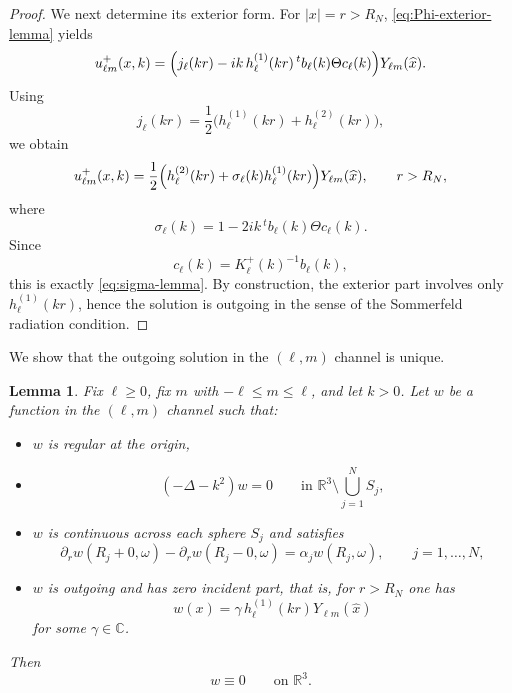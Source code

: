 \documentclass[a4paper,11pt]{article}
\numberwithin{equation}{section}
\newcommand{\R}{\mathbb{R}}
\newcommand{\C}{\mathbb{C}}
\newcommand{\jj}[1]{j_{#1}}
\newcommand{\hj}[1]{h^{(1)}_{#1}}
\newtheorem{lem}[thm]{Lemma}
\theoremstyle{definition}
\theoremstyle{remark}
\begin{document}
\begin{proof}
We next determine its exterior form. For $|x|=r>R_N$,
\eqref{eq:Phi-exterior-lemma} yields
\[
u_{\ell m}^+(x,k)
=
\Bigl(
\jj{\ell}(kr)
-
ik\,\hj{\ell}(kr)\,{}^t b_\ell(k)\Theta c_\ell(k)
\Bigr)Y_{\ell m}(\widehat x).
\]
Using
\[
\jj{\ell}(kr)=\frac12\bigl(\hj{\ell}(kr)+h_\ell^{(2)}(kr)\bigr),
\]
we obtain
\[
u_{\ell m}^+(x,k)
=
\frac12
\Bigl(
h_\ell^{(2)}(kr)+\sigma_\ell(k)\hj{\ell}(kr)
\Bigr)
Y_{\ell m}(\widehat x),
\qquad r>R_N,
\]
where
\[
\sigma_\ell(k)
=
1-2ik\,{}^t b_\ell(k)\Theta c_\ell(k).
\]
Since
\[
c_\ell(k)=K_\ell^+(k)^{-1}b_\ell(k),
\]
this is exactly \eqref{eq:sigma-lemma}.
By construction, the exterior part involves only $h_\ell^{(1)}(kr)$,
hence the solution is outgoing in the sense of the Sommerfeld
radiation condition.
\end{proof}
We show that the outgoing solution in the $(\ell,m)$ channel is unique.

\begin{lem}
\label{lem:no-homogeneous-outgoing}
Fix $\ell\ge0$, fix $m$ with $-\ell\le m\le\ell$, and let $k>0$.
Let $w$ be a function in the $(\ell,m)$ channel such that:

\begin{itemize}
\item[(i)]
$w$ is regular at the origin,

\item[(ii)]
\[
(-\Delta-k^2)w=0
\qquad \text{in }\R^3\setminus\bigcup_{j=1}^N S_j,
\]

\item[(iii)]
$w$ is continuous across each sphere $S_j$ and satisfies
\[
\partial_r w(R_j+0,\omega)-\partial_r w(R_j-0,\omega)
=
\alpha_j w(R_j,\omega),
\qquad j=1,\ldots,N,
\]

\item[(iv)]
$w$ is outgoing and has zero incident part, that is,
for $r>R_N$ one has
\[
w(x)=\gamma\,\hj{\ell}(kr)Y_{\ell m}(\widehat x)
\]
for some $\gamma\in\C$.
\end{itemize}

Then
\[
w\equiv0
\qquad \text{on }\R^3.
\]
\end{lem}
\end{document}
